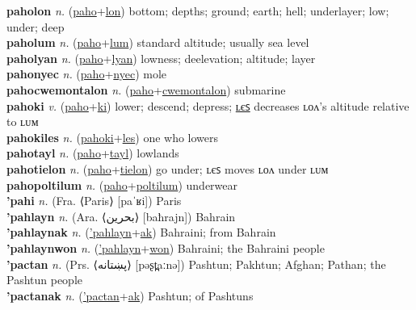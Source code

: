 \textbf{paholon} \textit{n.} (\hyperref[paho]{paho}+\hyperref[lon]{lon})
bottom; depths; ground; earth; hell; underlayer; low; under; deep \label{paholon} \\
\textbf{paholum} \textit{n.} (\hyperref[paho]{paho}+\hyperref[lum]{lum})
standard altitude; usually sea level \label{paholum} \\
\textbf{paholyan} \textit{n.} (\hyperref[paho]{paho}+\hyperref[lyan]{lyan})
lowness; deelevation; altitude; layer \label{paholyan} \\
\textbf{pahonyec} \textit{n.} (\hyperref[paho]{paho}+\hyperref[nyec]{nyec})
mole \label{pahonyec} \\
\textbf{pahocwemontalon} \textit{n.} (\hyperref[paho]{paho}+\hyperref[cwemontalon]{cwemontalon})
submarine \label{pahocwemontalon} \\
\textbf{pahoki} \textit{v.} (\hyperref[paho]{paho}+\hyperref[ki]{ki})
lower; descend; depress; \hyperref[pahokiles]{ʟєꜱ} decreases ʟᴏᴧ’s altitude relative to ʟᴜᴍ \label{pahoki} \\
\textbf{pahokiles} \textit{n.} (\hyperref[pahoki]{pahoki}+\hyperref[les]{les})
one who lowers \label{pahokiles} \\
\textbf{pahotayl} \textit{n.} (\hyperref[paho]{paho}+\hyperref[tayl]{tayl})
lowlands \label{pahotayl} \\
\textbf{pahotielon} \textit{n.} (\hyperref[paho]{paho}+\hyperref[tielon]{tielon})
go under; ʟєꜱ moves ʟᴏᴧ under ʟᴜᴍ \label{pahotielon} \\
\textbf{pahopoltilum} \textit{n.} (\hyperref[paho]{paho}+\hyperref[poltilum]{poltilum})
underwear \label{pahopoltilum} \\
\textbf{'pahi} \textit{n.} (Fra. ⟨Paris⟩ [paˈʁi])
Paris \label{'pahi} \\
\textbf{'pahlayn} \textit{n.} (Ara. ⟨بحرين‎⟩ [baħrajn])
Bahrain \label{'pahlayn} \\
\textbf{'pahlaynak} \textit{n.} (\hyperref['pahlayn]{'pahlayn}+\hyperref[ak]{ak})
Bahraini; from Bahrain \label{'pahlaynak} \\
\textbf{'pahlaynwon} \textit{n.} (\hyperref['pahlayn]{'pahlayn}+\hyperref[won]{won})
Bahraini; the Bahraini people \label{'pahlaynwon} \\
\textbf{'pactan} \textit{n.} (Prs. ⟨پښتانه‎‎⟩ [pəʂt̪aːnə])
Pashtun; Pakhtun; Afghan; Pathan; the Pashtun people \label{'pactan} \\
\textbf{'pactanak} \textit{n.} (\hyperref['pactan]{'pactan}+\hyperref[ak]{ak})
Pashtun; of Pashtuns \label{'pactanak} \\
